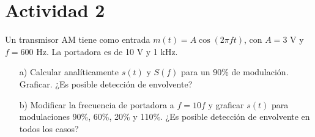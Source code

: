 \section{Actividad 2}

Un transmisor AM tiene como entrada $m(t)=A\cos(2\pi f t)$, con $A=3$ V y $f=600$ Hz. La portadora es de 10 V y 1 kHz.  

\begin{itemize}
    \item[a)] Calcular analíticamente $s(t)$ y $S(f)$ para un 90\% de modulación. Graficar. ¿Es posible detección de envolvente?  
    \item[b)] Modificar la frecuencia de portadora a $f=10f$ y graficar $s(t)$ para modulaciones 90\%, 60\%, 20\% y 110\%. ¿Es posible detección de envolvente en todos los casos?  
\end{itemize}
